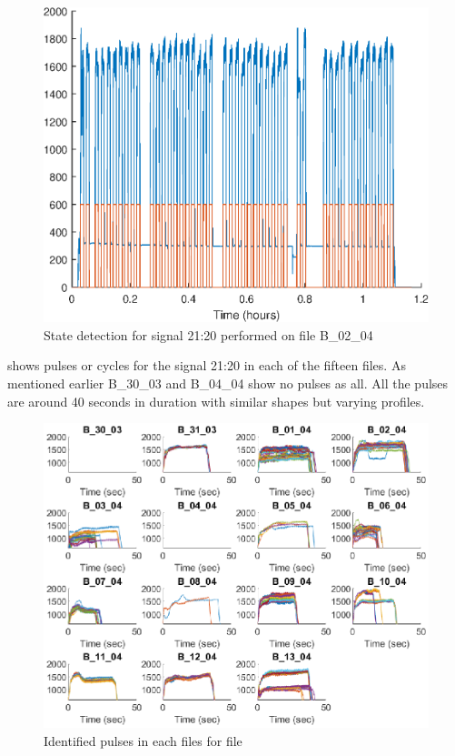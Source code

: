 \documentclass[]{article}
\begin{document}
\begin{figure}[H]
    \centering
    \includegraphics[scale=0.75]{figures/StateDetectionFig_B_02_04.eps}
    \caption{State detection for signal 21:20 performed on file B\_02\_04}
    \label{fig:StateDetectionFig_B_02_04}
\end{figure}

 shows pulses or cycles for the signal 21:20 in each of the fifteen files. As mentioned earlier B\_30\_03 and B\_04\_04 show no pulses as all. All the pulses are around 40 seconds in duration with similar shapes but varying profiles.
 
\begin{figure}[H]
    \centering
    \includegraphics[width=\textwidth, height=\textheight, keepaspectratio]{figures/IdentifiedPulsesFig.eps}
    \caption{Identified pulses in each files for file}
    \label{fig:IdentifiedPulses}
\end{figure}
\end{document}
